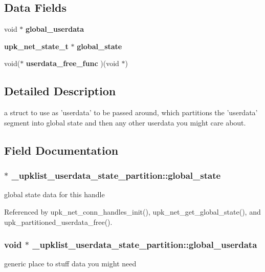 \subsection*{Data Fields}
\begin{DoxyCompactItemize}
\item 
void $\ast$ {\bf global\_\-userdata}
\item 
{\bf upk\_\-net\_\-state\_\-t} $\ast$ {\bf global\_\-state}
\item 
void($\ast$ {\bf userdata\_\-free\_\-func} )(void $\ast$)
\end{DoxyCompactItemize}


\subsection{Detailed Description}
a struct to use as 'userdata' to be passed around, which partitions the 'userdata' segment into global state and then any other userdata you might care about. 

\subsection{Field Documentation}
\subsubsection[{global\_\-state}]{ $\ast$ {\bf \_\-upklist\_\-userdata\_\-state\_\-partition::global\_\-state}}\label{struct__upklist__userdata__state__partition_a6c670d7155218987784644ae9c04d5a0}
global state data for this handle 

Referenced by upk\_\-net\_\-conn\_\-handles\_\-init(), upk\_\-net\_\-get\_\-global\_\-state(), and upk\_\-partitioned\_\-userdata\_\-free().

\subsubsection[{global\_\-userdata}]{\setlength{\rightskip}{0pt plus 5cm}void $\ast$ {\bf \_\-upklist\_\-userdata\_\-state\_\-partition::global\_\-userdata}}\label{struct__upklist__userdata__state__partition_a8d8b13ef1c480630e6c7e4343c51b800}
generic place to stuff data you might need 

